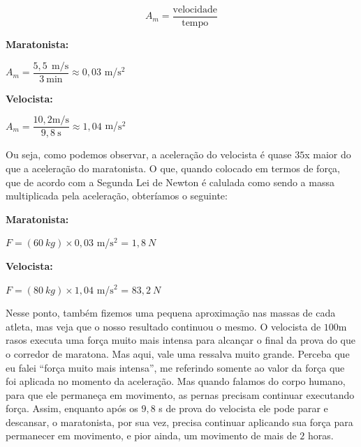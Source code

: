 \begin{multicols}{2}
\begin{equation*}
    A_{m} = \dfrac{\text{velocidade}}{\text{tempo}}
\end{equation*}

\noindent\textbf{Maratonista:}\par

$A_m = \dfrac{5,5 \: \: \text{m/s}}{3 \: \text{min}} \approx  0,03$ m/$\text{s}^2$

\noindent\textbf{Velocista:}\par 

$A_m = \dfrac{10,2 \text{m/s}}{9,8 \: \text{s}} \approx 1,04$ m/$\text{s}^2$

Ou seja, como podemos observar, a aceleração do velocista é quase $35$x maior do que a aceleração do maratonista. O que, quando colocado em termos de força, que de acordo com a Segunda Lei de Newton é calulada como sendo a massa multiplicada pela aceleração, obteríamos o seguinte:

\noindent\textbf{Maratonista:}\par

$F = (60 \: kg) \times  0,03$ m/$\text{s}^2$ = $1,8 \: N$

\noindent\textbf{Velocista:}\par

$F = (80 \: kg) \times  1,04 $ m/$\text{s}^2$ = $83,2 \: N$

Nesse ponto, também fizemos uma pequena aproximação nas massas de cada atleta, mas veja que o nosso resultado continuou o mesmo. O velocista de $100$m rasos executa uma força muito mais intensa para alcançar o final da prova do que o corredor de maratona. Mas aqui, vale uma ressalva muito grande. Perceba que eu falei ``força muito mais intensa'', me referindo somente ao valor da força que foi aplicada no momento da aceleração. Mas quando falamos do corpo humano, para que ele permaneça em movimento, as pernas precisam continuar executando força. Assim, enquanto após os $9,8$ s de prova do velocista ele pode parar e descansar, o maratonista, por sua vez, precisa continuar aplicando sua força para permanecer em movimento, e pior ainda, um movimento de mais de $2$ horas.


\end{multicols}
